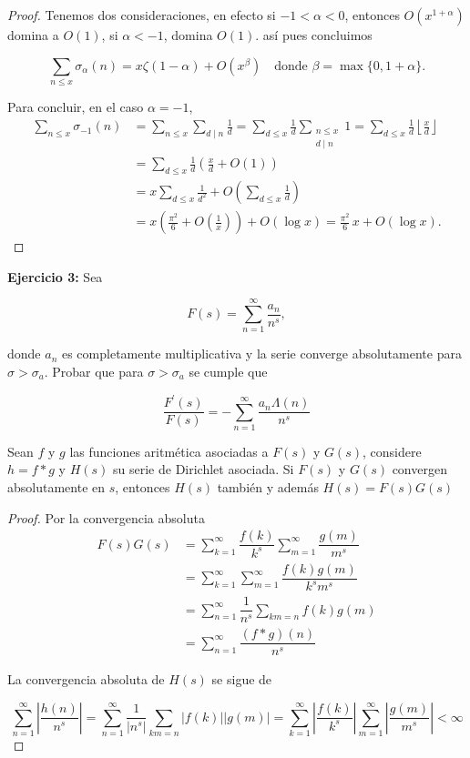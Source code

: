 \documentclass[12pt, a4paper]{article}
\begin{document}
\begin{proof}
	Tenemos dos consideraciones, en efecto si $-1<\alpha<0$, entonces $O(x^{1+\alpha})$ domina a $O(1)$, si $\alpha<-1$, domina $O(1)$. así pues concluimos

	$$\sum_{n \le x} \sigma_{\alpha}(n)=x\zeta(1-\alpha)+O(x^{\beta})\quad \text{donde } \beta=\max\{0,1+\alpha\}.$$

	Para concluir, en el caso $\alpha=-1$,
	\begin{align*}
		\sum_{n\le x}\sigma_{-1}(n)
		 & =\sum_{n\le x}\sum_{d\mid n}\frac{1}{d}
		=\sum_{d\le x}\frac{1}{d}\sum_{\substack{n\le x\\ d\mid n}}1
		=\sum_{d\le x}\frac{1}{d}\left\lfloor \frac{x}{d}\right\rfloor              \\
		 & =\sum_{d\le x}\frac{1}{d}\left(\frac{x}{d}+O(1)\right)                   \\
		 & = x\sum_{d\le x}\frac{1}{d^2} + O\!\left(\sum_{d\le x}\frac{1}{d}\right) \\
		 & = x\left(\frac{\pi^2}{6}+O\!\left(\frac{1}{x}\right)\right) + O(\log x)
		= \frac{\pi^2}{6}\,x + O(\log x).
	\end{align*}
\end{proof}

\textbf{Ejercicio 3:} Sea

$$F(s)=\sum_{n=1}^\infty \dfrac{a_n}{n^s},$$

donde $a_n$ es completamente multiplicativa y la serie converge absolutamente para $\sigma>\sigma_a$. Probar que para $\sigma>\sigma_a$ se cumple que

$$\dfrac{F^\prime(s)}{F(s)}=-\sum_{n=1}^\infty\dfrac{a_n\Lambda(n)}{n^s}$$

\begin{lemma}
	Sean $f$ y $g$ las funciones aritmética asociadas a $F(s)$ y $G(s)$, considere $h=f*g$ y $H(s)$ su serie de Dirichlet asociada. Si $F(s)$ y $G(s)$ convergen absolutamente en $s$, entonces $H(s)$ también y además $H(s)=F(s)G(s)$
\end{lemma}

\begin{proof}
	Por la convergencia absoluta
	\begin{align*}
		F(s)G(s) & =\sum_{k=1}^\infty\dfrac{f(k)}{k^s}\sum_{m=1}^\infty\dfrac{g(m)}{m^s} \\
		         & =\sum_{k=1}^\infty\sum_{m=1}^\infty\dfrac{f(k)g(m)}{k^sm^s}           \\
		         & =\sum_{n=1}^{\infty}\dfrac{1}{n^s}\sum_{km=n}f(k)g(m)                 \\
		         & =\sum_{n=1}^\infty\dfrac{(f*g)(n)}{n^s}
	\end{align*}

	La convergencia absoluta de $H(s)$ se sigue de

	$$\sum_{n=1}^\infty\left|\dfrac{h(n)}{n^s}\right|=\sum_{n=1}^{\infty}\dfrac{1}{|n^s|}\sum_{km=n}|f(k)||g(m)|=\sum_{k=1}^\infty\left|\dfrac{f(k)}{k^s}\right|\sum_{m=1}^\infty\left|\dfrac{g(m)}{m^s}\right|<\infty$$
\end{proof}
\end{document}
